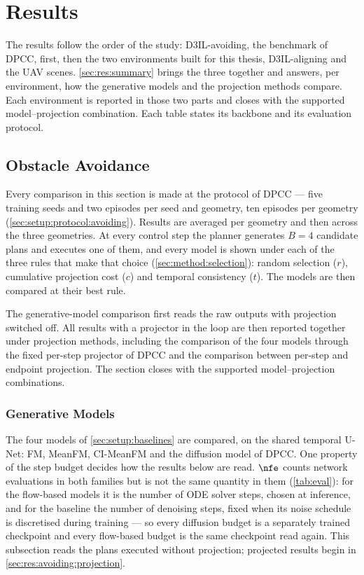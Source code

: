 \chapter{Results}\label{ch:results}

The results follow the order of the study: D3IL-avoiding, the benchmark of \ac{DPCC}, first, then
the two environments built for this thesis, D3IL-aligning and the UAV scenes. \autoref{sec:res:summary} brings the three together and
answers, per environment, how the generative models and the projection methods compare. Each
environment is reported in those two parts and closes with the supported model--projection combination.
Each table states its backbone and its evaluation protocol.

\section{Obstacle Avoidance}\label{sec:res:state}

Every comparison in this section is made at the protocol of \ac{DPCC} --- five training seeds and two
episodes per seed and geometry, ten episodes per geometry (\autoref{sec:setup:protocol:avoiding}).
Results are averaged per geometry and then across the three geometries. At every control step the planner generates
$B=4$ candidate plans and executes one of them, and every model is shown under each of the three rules
that make that choice (\autoref{sec:method:selection}): random selection ($r$), cumulative projection
cost ($c$) and temporal consistency ($t$). The models are then compared at their best rule.

The generative-model comparison first reads the raw outputs with projection switched off. All results
with a projector in the loop are then reported together under projection methods, including the
comparison of the four models through the fixed per-step projector of \ac{DPCC} and the comparison
between per-step and endpoint projection. The section closes with the supported model--projection
combinations.

\subsection{Generative Models}\label{sec:res:avoiding:models}

The four models of \autoref{sec:setup:baselines} are compared, on the shared temporal U-Net: FM,
MeanFM, CI-MeanFM and the diffusion model of \ac{DPCC}. One property of the step budget decides how the
results below are read. $\nfe$ counts network evaluations in both families but is not the same quantity
in them (\autoref{tab:eval}): for the flow-based models it is the number of ODE solver steps, chosen at
inference, and for the baseline the number of denoising steps, fixed when its noise schedule is
discretised during training --- so every diffusion budget is a separately trained checkpoint and every
flow-based budget is the same checkpoint read again. This subsection reads the plans executed without
projection; projected results begin in \autoref{sec:res:avoiding:projection}.

